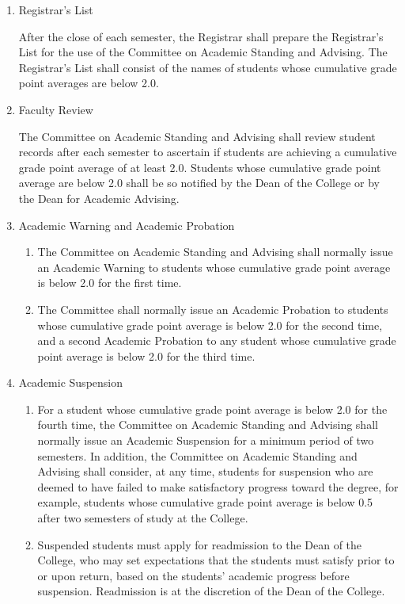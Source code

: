 \documentclass{manual}
\newcommand{\modified}[1]{}
\newcommand{\itemLevelA}{\alph*.}
\newcommand{\itemLevelB}{\arabic*)}
\newcommand{\itemRefA}{\alph*}
\newcommand{\itemRefB}{\arabic*}
\begin{document}
\begin{enumerate}[label=\itemLevelA,ref=\itemRefA]
\item Registrar's List \modified{4/14/09}

      After the close of each semester, the Registrar shall prepare the Registrar's List for the use of the        Committee on Academic Standing and Advising. The Registrar's List shall consist of the names of        students whose cumulative grade point averages are below 2.0.

\item Faculty Review \modified{4/14/09}        

The Committee on Academic Standing and Advising shall review student records after each semester to ascertain if students are achieving a cumulative grade point average of at least 2.0. Students whose cumulative grade point average are below 2.0 shall be so notified by the Dean of the College or by the Dean for Academic Advising.

\item Academic Warning and Academic Probation \modified{4/14/09}       

\begin{enumerate}[label=\itemLevelB,ref=\itemRefB]
\item The Committee on Academic Standing and Advising shall normally issue an Academic Warning to students whose cumulative grade point average is below 2.0 for the first time. 
\item The Committee shall normally issue an Academic Probation to students whose cumulative grade point average is below 2.0 for the second time, and a second Academic Probation to any student whose cumulative grade point average is below 2.0 for the third time. 
\end{enumerate}

\item Academic Suspension

\begin{enumerate}[label=\itemLevelB,ref=\itemRefB]

\item For a student whose cumulative grade point average is below 2.0 for the fourth time, the Committee on Academic Standing and Advising shall normally issue an Academic Suspension for a minimum period of two semesters. In addition, the Committee on Academic Standing and Advising shall consider, at any time, students for suspension\modified{5/08/12} who are deemed to have failed to make satisfactory progress toward the degree, for example, students whose cumulative grade point average is below 0.5 after two semesters of study at the College. 
\item Suspended students must apply for readmission to the Dean of the College, who may set expectations that the students must satisfy prior to or upon return, based on the students' academic progress before suspension. Readmission is at the discretion of the Dean of the College.
\end{enumerate}


\end{enumerate}
\end{document}
